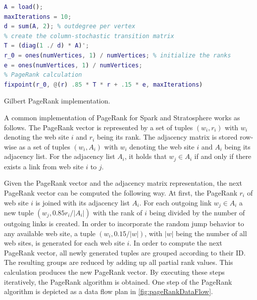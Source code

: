 \begin{listing}[!h]
	\begin{CenteredBox}
		\begin{lstlisting}[language=Matlab,
		commentstyle=\color{black},
		  stringstyle=\color{black},
		  keywordstyle=\color{black}\bfseries,
		  morekeywords={ones, fixpoint},]
% load adjacency matrix
A = load();
maxIterations = 10;
d = sum(A, 2); % outdegree per vertex
% create the column-stochastic transition matrix
T = (diag(1 ./ d) * A)'; 
r_0 = ones(numVertices, 1) / numVertices; % initialize the ranks
e = ones(numVertices, 1) / numVertices;
% PageRank calculation
fixpoint(r_0, @(r) .85 * T * r + .15 * e, maxIterations)
		\end{lstlisting}
	\end{CenteredBox}
	\caption{Gilbert PageRank implementation.}
	\label{lst:gilbertPageRank}
\end{listing}

A common implementation of PageRank for Spark and Stratosphere works as follows.
The PageRank vector is represented by a set of tuples $(w_i, r_i)$ with $w_i$ denoting the web site $i$ and $r_i$ being its rank.
The adjacency matrix is stored row-wise as a set of tuples $(w_i, A_i)$ with $w_i$ denoting the web site $i$ and $A_i$ being its adjacency list.
For the adjacency list $A_i$, it holds that $w_j \in A_i$ if and only if there exists a link from web site $i$ to $j$.

Given the PageRank vector and the adjacency matrix representation, the next PageRank vector can be computed the following way.
At first, the PageRank $r_i$ of web site $i$ is joined with its adjacency list $A_i$.
For each outgoing link $w_j \in A_i$ a new tuple $(w_j, 0.85r_i/\left|A_i\right|)$ with the rank of $i$ being divided by the number of outgoing links is created.
In order to incorporate the random jump behavior to any available web site, a tuple $(w_i, 0.15/|w|)$, with $|w|$ being the number of all web sites, is generated for each web site $i$.
In order to compute the next PageRank vector, all newly generated tuples are grouped according to their ID.
The resulting groups are reduced by adding up all partial rank values.
This calculation produces the new PageRank vector.
By executing these steps iteratively, the PageRank algorithm is obtained.
One step of the PageRank algorithm is depicted as a data flow plan in \cref{fig:pageRankDataFlow}.

